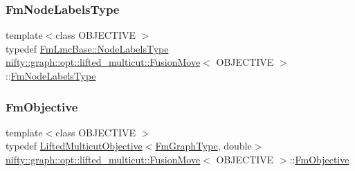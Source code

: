 \mbox{\label{classnifty_1_1graph_1_1opt_1_1lifted__multicut_1_1FusionMove_afc62b9ce040d06e5ca24743801283baa}} 
\subsubsection{\texorpdfstring{Fm\+Node\+Labels\+Type}{FmNodeLabelsType}}
{\footnotesize\ttfamily template$<$class O\+B\+J\+E\+C\+T\+I\+VE $>$ \\
typedef \hyperlink{classnifty_1_1graph_1_1opt_1_1common_1_1SolverBase_abefd51561de2fd009f6bed6bef6009ea}{Fm\+Lmc\+Base\+::\+Node\+Labels\+Type} \hyperlink{classnifty_1_1graph_1_1opt_1_1lifted__multicut_1_1FusionMove}{nifty\+::graph\+::opt\+::lifted\+\_\+multicut\+::\+Fusion\+Move}$<$ O\+B\+J\+E\+C\+T\+I\+VE $>$\+::\hyperlink{classnifty_1_1graph_1_1opt_1_1lifted__multicut_1_1FusionMove_afc62b9ce040d06e5ca24743801283baa}{Fm\+Node\+Labels\+Type}}

\mbox{\label{classnifty_1_1graph_1_1opt_1_1lifted__multicut_1_1FusionMove_a2832b78e4b938a4cf4fa49c79d1c9595}} 
\subsubsection{\texorpdfstring{Fm\+Objective}{FmObjective}}
{\footnotesize\ttfamily template$<$class O\+B\+J\+E\+C\+T\+I\+VE $>$ \\
typedef \hyperlink{classnifty_1_1graph_1_1opt_1_1lifted__multicut_1_1LiftedMulticutObjective}{Lifted\+Multicut\+Objective}$<$\hyperlink{classnifty_1_1graph_1_1opt_1_1lifted__multicut_1_1FusionMove_a234a5bccc4dc41a7c197b7db12e4898b}{Fm\+Graph\+Type}, double$>$ \hyperlink{classnifty_1_1graph_1_1opt_1_1lifted__multicut_1_1FusionMove}{nifty\+::graph\+::opt\+::lifted\+\_\+multicut\+::\+Fusion\+Move}$<$ O\+B\+J\+E\+C\+T\+I\+VE $>$\+::\hyperlink{classnifty_1_1graph_1_1opt_1_1lifted__multicut_1_1FusionMove_a2832b78e4b938a4cf4fa49c79d1c9595}{Fm\+Objective}}

